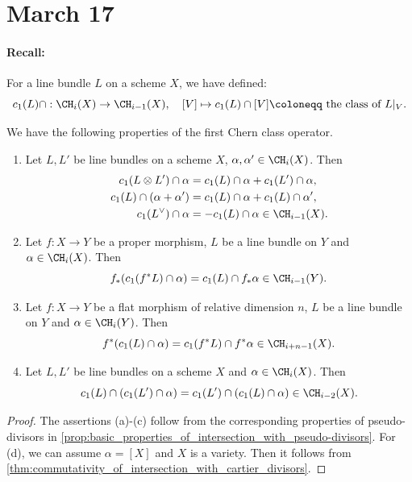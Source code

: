 \section{March 17}

\paragraph{Recall:}
For a line bundle $L$ on a scheme $X$, we have defined:
\[ c_1(L) \cap : \CH_i(X) \to \CH_{i-1}(X), \quad [V] \mapsto c_1(L) \cap [V] \coloneqq \text{ the class of } L|_V. \]

\begin{proposition}\label{prop:properties_of_intersection_with_first_chern_class_operator}
  We have the following properties of the first Chern class operator.
  \begin{enumerate}
    \item Let $L,L'$ be line bundles on a scheme $X$, $\alpha, \alpha' \in \CH_i(X)$.
      Then
      \begin{align*}
        c_1(L \otimes L') \cap \alpha & = c_1(L) \cap \alpha + c_1(L') \cap \alpha, \\
        c_1(L) \cap (\alpha + \alpha') & = c_1(L) \cap \alpha + c_1(L) \cap \alpha', \\
        c_1(L^\vee) \cap \alpha & = - c_1(L) \cap \alpha \in \CH_{i-1}(X).
      \end{align*}
    \item Let $f: X \to Y$ be a proper morphism, $L$ be a line bundle on $Y$ and $\alpha \in \CH_i(X)$.
      Then
      \[ f_*( c_1(f^*L) \cap \alpha ) = c_1(L) \cap f_*\alpha \in \CH_{i-1}(Y). \]
    \item Let $f: X \to Y$ be a flat morphism of relative dimension $n$, $L$ be a line bundle on $Y$ and $\alpha \in \CH_i(Y)$.
      Then
      \[ f^*( c_1(L) \cap \alpha ) = c_1(f^*L) \cap f^*\alpha \in \CH_{i+n-1}(X). \]
    \item Let $L,L'$ be line bundles on a scheme $X$ and $\alpha \in \CH_i(X)$.
      Then
      \[ c_1(L) \cap ( c_1(L') \cap \alpha ) = c_1(L') \cap ( c_1(L) \cap \alpha ) \in \CH_{i-2}(X). \]
  \end{enumerate}
\end{proposition}
\begin{proof}
  The assertions (a)-(c) follow from the corresponding properties of pseudo-divisors in \cref{prop:basic_properties_of_intersection_with_pseudo-divisors}.
  For (d), we can assume $\alpha = [X]$ and $X$ is a variety.
  Then it follows from \cref{thm:commutativity_of_intersection_with_cartier_divisors}.
\end{proof}



